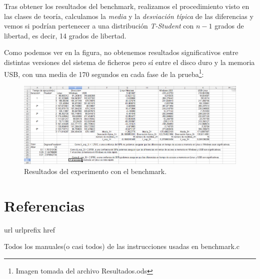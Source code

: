 \documentclass[paper=a4, fontsize=11pt]{scrartcl} %
\numberwithin{equation}{section} %
\numberwithin{figure}{section} %
\numberwithin{table}{section} %
\begin{document}
		Tras obtener los resultados del benchmark, realizamos el procedimiento visto en las clases
		de teoría, calculamos la \textit{media} y la \textit{desviación típica} de las diferencias y
		vemos si podrían pertenecer a una distribución \textit{T-Student} con $n-1$ grados de
		libertad, es decir, 14 grados de libertad.
		
		Como podemos ver en la figura, no obtenemos resultados significativos entre distintas
		versiones del sistema de ficheros pero sí entre el disco duro y la memoria USB, con una
		media de 170 segundos en cada fase de la prueba\footnote{Imagen tomada del archivo
		Resultados.ods}:
		 
		 \begin{figure}[H]
 			\centering
			\includegraphics[width=15cm]{Resultados.jpg}
 			\caption{Resultados del experimento con el benchmark.}
 			\label{fig:benchmark}	
 		\end{figure}

		\cite{man_benchmark}

\newpage
\section{Referencias}
\begin{thebibliography}{10}
\expandafter\ifx\csname url\endcsname\relax
  \def\url#1{\texttt{#1}}\fi
\expandafter\ifx\csname urlprefix\endcsname\relax\def\urlprefix{URL}\fi
\expandafter\ifx\csname href\endcsname\relax
  \def\href#1#2{#2} \def\path#1{#1}\fi

Todos los manuales(o casi todos) de las instrucciones usadas en benchmark.c

\end{thebibliography}
\end{document}
